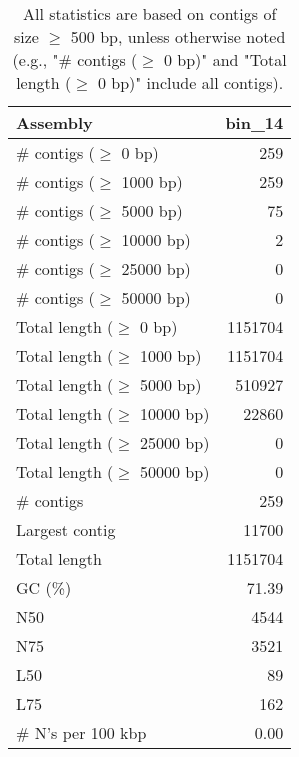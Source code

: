 \documentclass[12pt,a4paper]{article}
\begin{document}
\begin{table}[ht]
\begin{center}
\caption{All statistics are based on contigs of size $\geq$ 500 bp, unless otherwise noted (e.g., "\# contigs ($\geq$ 0 bp)" and "Total length ($\geq$ 0 bp)" include all contigs).}
\begin{tabular}{|l*{1}{|r}|}
\hline
Assembly & bin\_14 \\ \hline
\# contigs ($\geq$ 0 bp) & 259 \\ \hline
\# contigs ($\geq$ 1000 bp) & 259 \\ \hline
\# contigs ($\geq$ 5000 bp) & 75 \\ \hline
\# contigs ($\geq$ 10000 bp) & 2 \\ \hline
\# contigs ($\geq$ 25000 bp) & 0 \\ \hline
\# contigs ($\geq$ 50000 bp) & 0 \\ \hline
Total length ($\geq$ 0 bp) & 1151704 \\ \hline
Total length ($\geq$ 1000 bp) & 1151704 \\ \hline
Total length ($\geq$ 5000 bp) & 510927 \\ \hline
Total length ($\geq$ 10000 bp) & 22860 \\ \hline
Total length ($\geq$ 25000 bp) & 0 \\ \hline
Total length ($\geq$ 50000 bp) & 0 \\ \hline
\# contigs & 259 \\ \hline
Largest contig & 11700 \\ \hline
Total length & 1151704 \\ \hline
GC (\%) & 71.39 \\ \hline
N50 & 4544 \\ \hline
N75 & 3521 \\ \hline
L50 & 89 \\ \hline
L75 & 162 \\ \hline
\# N's per 100 kbp & 0.00 \\ \hline
\end{tabular}
\end{center}
\end{table}
\end{document}
